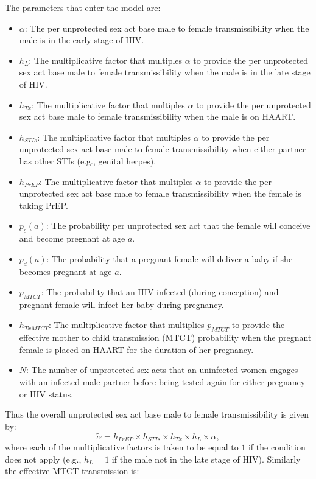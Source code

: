 \documentclass[11pt]{nih_mod}
\begin{document}
The parameters that enter the model are:
\begin{itemize}
	\item $\alpha$: The per unprotected sex act base male to female transmissibility when the male is in the early stage of HIV.
	\item $h_L$: The multiplicative factor that multiples $\alpha$ to provide the per unprotected sex act base male to female transmissibility when the male is in the late stage of HIV.
	\item $h_{Tx}$: The multiplicative factor that multiples $\alpha$ to provide the per unprotected sex act base male to female transmissibility when the male is on HAART.
	\item $h_{STIs}$: The multiplicative factor that multiples $\alpha$ to provide the per unprotected sex act base male to female transmissibility when either partner has other STIs (e.g., genital herpes). 
	\item $h_{PrEP}$: The multiplicative factor that multiples $\alpha$ to provide the per unprotected sex act base male to female transmissibility when the female is taking PrEP.
	\item $p_c(a)$: The probability per unprotected sex act that the female will conceive and become pregnant at age $a$.
	\item $p_d(a)$: The probability that a pregnant female will deliver a baby if she becomes pregnant at age $a$.
	\item $p_{MTCT}$: The probability that an HIV infected (during conception) and pregnant female will infect her baby during pregnancy. 
	\item $h_{TxMTCT}$: The multiplicative factor that multiplies $p_{MTCT}$ to provide the effective mother to child transmission (MTCT) probability when the pregnant female is placed on HAART for the duration of her pregnancy. 
	\item $N$: The number of unprotected sex acts that an uninfected women engages with an infected male partner before being tested again for either pregnancy or HIV status.
\end{itemize}
Thus the overall unprotected sex act base male to female transmissibility is given by:
\begin{equation}
	\tilde{\alpha} = h_{PrEP}\times h_{STIs}\times h_{Tx}\times h_L \times \alpha, 
\end{equation}
where each of the multiplicative factors is taken to be equal to $1$ if the condition does not apply (e.g., $h_L=1$ if the male not in the late stage of HIV). Similarly the effective MTCT transmission is:
\end{document}
